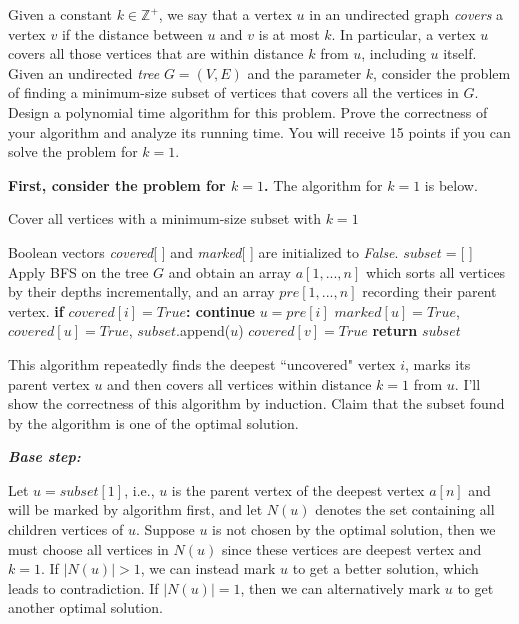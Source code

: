 \documentclass{oxmathproblems}
\begin{document}
\begin{questions}

\miquestion[25]
Given a constant $k\in\mathbb{Z}^+$, we say that a vertex $u$ in an undirected graph \emph{covers} a vertex $v$ if the distance between $u$ and $v$ is at most $k$. In particular, a vertex $u$ covers all those vertices that are within distance $k$ from $u$, including $u$ itself. Given an undirected \emph{tree} $G=(V,E)$ and the parameter $k$, consider the problem of finding a minimum-size subset of vertices that covers all the vertices in $G$.
Design a polynomial time algorithm for this problem. Prove the correctness of your algorithm and analyze its running time.
You will receive 15 points if you can solve the problem for $k=1$.

\begin{Solution}

\textbf{First, consider the problem for $k=1$.} The algorithm for $k=1$ is below.

\begin{algorithm}[H]
    \caption{Cover all vertices with a minimum-size subset with $k=1$}
    \label{}
    \begin{algorithmic}[1]
        \State Boolean vectors \textit{covered}[ ] and \textit{marked}[ ] are initialized to \textit{False}.
        \State $subset=$[ ]
        \State Apply BFS on the tree $G$ and obtain an array $a[1,...,n]$ which sorts all vertices by their depths incrementally, and an array $pre[1,...,n]$ recording their parent vertex.
        \State \textbf{if} $covered[i]=True$\textbf{: continue}
            \State $u=pre[i]$
            \State $marked[u]=True$, $covered[u]=True$, $subset$.append($u$)
             
                \State $covered[v]=True$
            \EndFor
        \EndFor
        \State \textbf{return} $subset$
    \end{algorithmic}
\end{algorithm}

This algorithm repeatedly finds the deepest ``uncovered" vertex $i$, marks its parent vertex $u$ and then covers all vertices within distance $k=1$ from $u$. I'll show the correctness of this algorithm by induction. Claim that the subset found by the algorithm is one of the optimal solution.

\textit{\textbf{Base step:}}

Let $u=subset[1]$, i.e., $u$ is the parent vertex of the deepest vertex $a[n]$ and will be marked by algorithm first, and let $N(u)$ denotes the set containing all children vertices of $u$. Suppose $u$ is not chosen by the optimal solution, then we must choose all vertices in $N(u)$ since these vertices are deepest vertex and $k=1$. If $|N(u)|>1$, we can instead mark $u$ to get a better solution, which leads to contradiction. If $|N(u)|=1$, then we can alternatively mark $u$ to get another optimal solution.


\end{Solution}
\end{questions}
\end{document}
